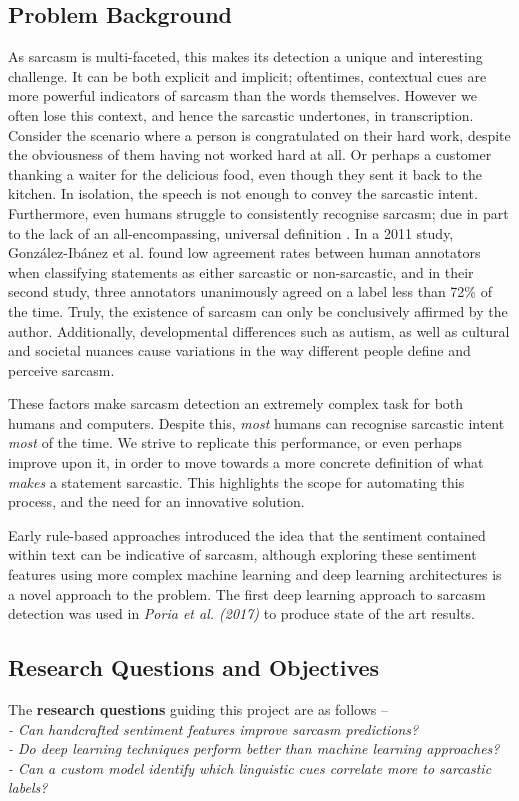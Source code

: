 \documentclass[12pt,a4paper]{article}
\begin{document}
\subsection{Problem Background}
\noindent As sarcasm is multi-faceted, this makes its detection a unique and interesting challenge. It can be both explicit and implicit; oftentimes, contextual cues are more powerful indicators of sarcasm than the words themselves. However we often lose this context, and hence the sarcastic undertones, in transcription. Consider the scenario where a person is congratulated on their hard work, despite the obviousness of them having not worked hard at all. Or perhaps a customer thanking a waiter for the delicious food, even though they sent it back to the kitchen. In isolation, the speech is not enough to convey the sarcastic intent. Furthermore, even humans struggle to consistently recognise sarcasm; due in part to the lack of an all-encompassing, universal definition
. In a 2011 study, Gonz{\'a}lez-Ib{\'a}nez et al. \cite{gonzalez2011identifying} found low agreement rates between human annotators when classifying statements as either sarcastic or non-sarcastic, and in their second study, three annotators unanimously agreed on a label less than 72\% of the time. Truly, the existence of sarcasm can only be conclusively affirmed by the author. Additionally, developmental differences such as autism, as well as cultural and societal nuances cause variations in the way different people define and perceive sarcasm.

These factors make sarcasm detection an extremely complex task for both humans and computers. Despite this, \textit{most} humans can recognise sarcastic intent \textit{most} of the time. We strive to replicate this performance, or even perhaps improve upon it, in order to move towards a more concrete definition of what \textit{makes} a statement sarcastic. This highlights the scope for automating this process, and the need for an innovative solution.

Early rule-based approaches introduced the idea that the sentiment contained within text can be indicative of sarcasm, although exploring these sentiment features using more complex machine learning and deep learning architectures is a novel approach to the problem. The first deep learning approach to sarcasm detection was used in \textit{Poria et al. (2017)} \cite{poria2016deeper} to produce state of the art results. 

\subsection{Research Questions and Objectives}
\noindent The \textbf{research questions} guiding this project are as follows --\\
\indent \textit{- Can handcrafted sentiment features improve sarcasm predictions?}\\ 
\indent \textit{- Do deep learning techniques perform better than machine learning approaches?}\\ 
\indent \textit{- Can a custom model identify which linguistic cues correlate more to sarcastic labels?}\\
\end{document}
